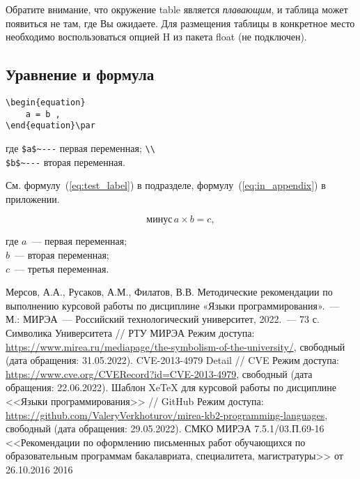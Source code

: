 \documentclass[14pt, a4paper, titlepage]{extarticle}
\begin{document}
Обратите внимание, что окружение table является \emph{плавающим}, и таблица может появиться не там, где Вы ожидаете. Для размещения таблицы в конкретное место необходимо воспользоваться опцией H из пакета float (не подключен).

\subsection{Уравнение и формула}

\begin{verbatim}
\begin{equation}
    a = b ,
\end{equation}\par
\end{verbatim}\vspace{-.5cm}
{где \verb"$a$~---" первая переменная; \verb"\\" \\
\verb"$b$~---" вторая переменная.}\bigskip

См. формулу~(\ref{eq:test_label}) в подразделе, формулу~(\ref{eq:in_appendix}) в приложении.

\begin{equation}\label{eq:test_label}
    \text{минус}\,a\times b=c ,
\end{equation}

где $a$~--- первая переменная; \\
$b$~--- вторая переменная; \\
$c$~--- третья переменная.



\begin{thebibliography}{99\kern\bibindent}
     Мерсов, А.А., Русаков, А.М., Филатов, В.В. Методические рекомендации по выполнению курсовой работы по дисциплине «Языки программирования».~--- М.: МИРЭА~--- Российский технологический университет, 2022.~--- 73 с.
     Символика Университета // РТУ МИРЭА Режим доступа: \url{https://www.mirea.ru/mediapage/the-symbolism-of-the-university/}, свободный (дата обращения: 31.05.2022).
     CVE-2013-4979 Detail // CVE Режим доступа: \url{https://www.cve.org/CVERecord?id=CVE-2013-4979}, свободный (дата обращения: 22.06.2022).
     Шаблон XeTeX для курсовой работы по дисциплине <<Языки программирования>> // GitHub Режим доступа: \url{https://github.com/ValeryVerkhoturov/mirea-kb2-programming-languages}, свободный (дата обращения: 29.05.2022).
     СМКО МИРЭА 7.5.1/03.П.69-16 <<Рекомендации по оформлению письменных работ обучающихся по образовательным программам бакалавриата, специалитета, магистратуры>> от 26.10.2016 2016
\end{thebibliography}
\end{document}
